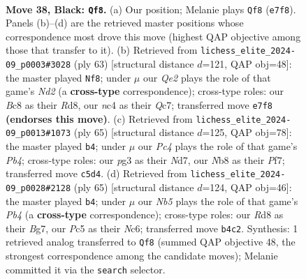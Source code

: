 \documentclass[11pt]{article}
\begin{document}
\clearpage

\begin{figure}[p]\centering
\begin{subfigure}{0.46\textwidth}\centering
\resizebox{\linewidth}{!}{%
\newchessgame
\chessboard[
  setfen={rnbr4/1p2q1k1/4p3/p1p2p1p/PnNP1P2/1P3NP1/3QB1KP/3R3R b - - 0 38},
  showmover=false,
  pgfstyle=straightmove, color=movearrow, markmove={e7-f8}
]}
\caption{}
\end{subfigure}\hfill
\begin{subfigure}{0.46\textwidth}\centering
\resizebox{\linewidth}{!}{%
\newchessgame
\chessboard[
  setfen={3rr1k1/1pqn1p2/p1pb2p1/P6p/1P1Q4/3NP1P1/4BPKP/1R1R4 b - - 4 32},
  showmover=false,
  pgfstyle=straightmove, color=movearrow, markmove={d7-f8}
]}
\caption{}
\end{subfigure}
\\[4pt]
\begin{subfigure}{0.46\textwidth}\centering
\resizebox{\linewidth}{!}{%
\newchessgame
\chessboard[
  setfen={r1r3k1/1q1n1pp1/b3p1np/pp1p4/3P2PP/1PN2P2/P2QP1B1/2RRB1K1 b - - 0 33},
  showmover=false,
  pgfstyle=straightmove, color=movearrow, markmove={b5-b4}
]}
\caption{}
\end{subfigure}\hfill
\begin{subfigure}{0.46\textwidth}\centering
\resizebox{\linewidth}{!}{%
\newchessgame
\chessboard[
  setfen={5rk1/1r1q2bp/2n1p1p1/1p1p4/p2P1PP1/P1BQ1RN1/1P2R1KP/8 b - - 5 33},
  showmover=false,
  pgfstyle=straightmove, color=movearrow, markmove={b5-b4}
]}
\caption{}
\end{subfigure}
\caption{\textbf{Move 38, Black: \texttt{Qf8}.} (a) Our position; Melanie plays \texttt{Qf8} (\texttt{e7f8}). Panels (b)--(d) are the retrieved master positions whose correspondence most drove this move (highest QAP objective among those that transfer to it). (b) Retrieved from \texttt{lichess\_elite\_2024-09\_p0003\#3028} (ply 63) [structural distance $d$=121, QAP obj=48]: the master played \texttt{Nf8}; under $\mu$ our \emph{Qe2} plays the role of that game's \emph{Nd2} (a \textbf{cross-type} correspondence); cross-type roles: our \emph{B}c8 as their \emph{R}d8, our \emph{n}c4 as their \emph{Q}c7; transferred move \texttt{e7f8} \textbf{(endorses this move)}. (c) Retrieved from \texttt{lichess\_elite\_2024-09\_p0013\#1073} (ply 65) [structural distance $d$=125, QAP obj=78]: the master played \texttt{b4}; under $\mu$ our \emph{Pc4} plays the role of that game's \emph{Pb4}; cross-type roles: our \emph{p}g3 as their \emph{N}d7, our \emph{N}b8 as their \emph{P}f7; transferred move \texttt{c5d4}. (d) Retrieved from \texttt{lichess\_elite\_2024-09\_p0028\#2128} (ply 65) [structural distance $d$=124, QAP obj=46]: the master played \texttt{b4}; under $\mu$ our \emph{Nb5} plays the role of that game's \emph{Pb4} (a \textbf{cross-type} correspondence); cross-type roles: our \emph{R}d8 as their \emph{B}g7, our \emph{P}c5 as their \emph{N}c6; transferred move \texttt{b4c2}. Synthesis: 1 retrieved analog transferred to \texttt{Qf8} (summed QAP objective 48, the strongest correspondence among the candidate moves); Melanie committed it via the \texttt{search} selector.}
\label{fig:thought-m75}
\end{figure}
\end{document}
